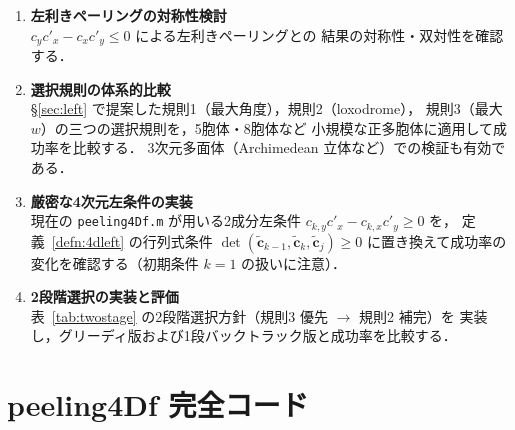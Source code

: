 \documentclass[12pt,a4paper]{article}
\theoremstyle{definition}
\begin{document}
\begin{enumerate}
  \item \textbf{左利きペーリングの対称性検討}\\
        $c_y c'_x - c_x c'_y \leq 0$ による左利きペーリングとの
        結果の対称性・双対性を確認する．

  \item \textbf{選択規則の体系的比較}\\
        §\ref{sec:left} で提案した規則1（最大角度），規則2（loxodrome），
        規則3（最大 $w$）の三つの選択規則を，5胞体・8胞体など
        小規模な正多胞体に適用して成功率を比較する．
        3次元多面体（Archimedean 立体など）での検証も有効である．

  \item \textbf{厳密な4次元左条件の実装}\\
        現在の \texttt{peeling4Df.m} が用いる2成分左条件
        $c_{k,y}c'_x - c_{k,x}c'_y \ge 0$ を，
        定義~\ref{defn:4dleft} の行列式条件
        $\det(\tilde{\mathbf{c}}_{k-1}, \tilde{\mathbf{c}}_k, \tilde{\mathbf{c}}_j) \ge 0$
        に置き換えて成功率の変化を確認する（初期条件 $k=1$ の扱いに注意）．

  \item \textbf{2段階選択の実装と評価}\\
        表~\ref{tab:twostage} の2段階選択方針（規則3 優先 $\to$ 規則2 補完）を
        実装し，グリーディ版および1段バックトラック版と成功率を比較する．
\end{enumerate}


\appendix
\section{peeling4Df 完全コード}
\end{document}
